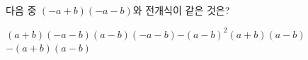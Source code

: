 다음 중 $(-a+b)(-a-b)$와 전개식이 같은 것은?
\begin{choicesii}{$(a+b)(-a-b)$}{$(a-b)(-a-b)$}{$-(a-b)^2$}{$(a+b)(a-b)$}{$-(a+b)(a-b)$}\end{choicesii}
